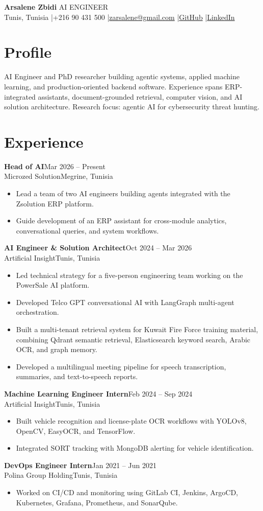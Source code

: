 \documentclass[10pt,a4paper]{article}
\newcommand{\role}[4]{\textbf{#1}\hfill{\small #2}\\{\small\color{green}#3}\hfill{\small\color{gray}#4}\par}
\begin{document}
{\Huge\bfseries\color{ink} Arsalene Zbidi}\hfill{\large\color{green} AI ENGINEER}\\[4pt]
Tunis, Tunisia \quad|\quad +216 90 431 500 \quad|\quad \href{mailto:zarsalene@gmail.com}{zarsalene@gmail.com} \quad|\quad \href{https://github.com/zarsalene}{GitHub} \quad|\quad \href{https://tn.linkedin.com/in/arsalenezbidi}{LinkedIn}

\section{Profile}
AI Engineer and PhD researcher building agentic systems, applied machine learning, and production-oriented backend software. Experience spans ERP-integrated assistants, document-grounded retrieval, computer vision, and AI solution architecture. Research focus: agentic AI for cybersecurity threat hunting.

\section{Experience}
\role{Head of AI}{Mar 2026 -- Present}{Microzed Solution}{Megrine, Tunisia}
\begin{itemize}
  \item Lead a team of two AI engineers building agents integrated with the Zsolution ERP platform.
  \item Guide development of an ERP assistant for cross-module analytics, conversational queries, and system workflows.
\end{itemize}
\role{AI Engineer \& Solution Architect}{Oct 2024 -- Mar 2026}{Artificial Insight}{Tunis, Tunisia}
\begin{itemize}
  \item Led technical strategy for a five-person engineering team working on the PowerSale AI platform.
  \item Developed Telco GPT conversational AI with LangGraph multi-agent orchestration.
  \item Built a multi-tenant retrieval system for Kuwait Fire Force training material, combining Qdrant semantic retrieval, Elasticsearch keyword search, Arabic OCR, and graph memory.
  \item Developed a multilingual meeting pipeline for speech transcription, summaries, and text-to-speech reports.
\end{itemize}
\role{Machine Learning Engineer Intern}{Feb 2024 -- Sep 2024}{Artificial Insight}{Tunis, Tunisia}
\begin{itemize}
  \item Built vehicle recognition and license-plate OCR workflows with YOLOv8, OpenCV, EasyOCR, and TensorFlow.
  \item Integrated SORT tracking with MongoDB alerting for vehicle identification.
\end{itemize}
\role{DevOps Engineer Intern}{Jan 2021 -- Jun 2021}{Polina Group Holding}{Tunis, Tunisia}
\begin{itemize}
  \item Worked on CI/CD and monitoring using GitLab CI, Jenkins, ArgoCD, Kubernetes, Grafana, Prometheus, and SonarQube.
\end{itemize}
\end{document}
